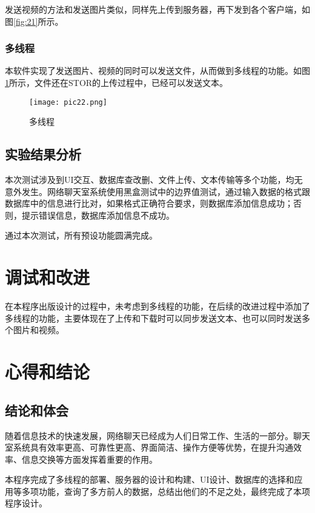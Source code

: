 \documentclass[forprint]{sql}
\begin{document}
发送视频的方法和发送图片类似，同样先上传到服务器，再下发到各个客户端，如图\ref{fig:21}所示。

\subsection{多线程}

本软件实现了发送图片、视频的同时可以发送文件，从而做到多线程的功能。如图\ref{fig:22}所示，文件还在STOR的上传过程中，已经可以发送文本。

\begin{figure}[!htbp]
	\centering
	\texttt{[image: pic22.png]}
	\caption{多线程}
	\label{fig:22}
\end{figure}

\section{实验结果分析}

本次测试涉及到UI交互、数据库查改删、文件上传、文本传输等多个功能，均无意外发生。网络聊天室系统使用黑盒测试中的边界值测试，通过输入数据的格式跟数据库中的信息进行比对，如果格式正确符合要求，则数据库添加信息成功；否则，提示错误信息，数据库添加信息不成功。

通过本次测试，所有预设功能圆满完成。

\chapter{调试和改进}

在本程序出版设计的过程中，未考虑到多线程的功能，在后续的改进过程中添加了多线程的功能，主要体现在了上传和下载时可以同步发送文本、也可以同时发送多个图片和视频。

\chapter{心得和结论}

\section{结论和体会}

随着信息技术的快速发展，网络聊天已经成为人们日常工作、生活的一部分。聊天室系统具有效率更高、可靠性更高、界面简洁、操作方便等优势，在提升沟通效率、信息交换等方面发挥着重要的作用。

本程序完成了多线程的部署、服务器的设计和构建、UI设计、数据库的选择和应用等多项功能，查询了多方前人的数据，总结出他们的不足之处，最终完成了本项程序设计。
\end{document}
